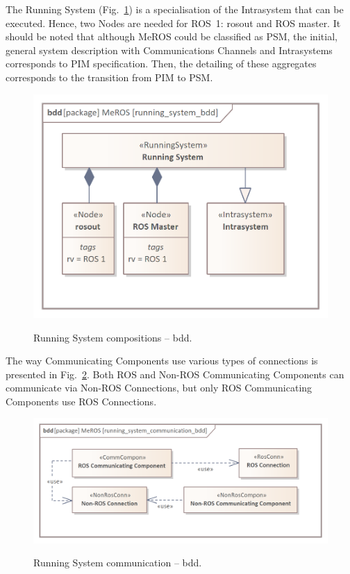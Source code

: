 The Running System (Fig.~\ref{fig:running_system_bdd}) is a specialisation of the Intrasystem that can be executed. Hence, two Nodes are needed for ROS~1: rosout and ROS master.
It should be noted that although MeROS could be classified as PSM, the initial, general system description with Communications Channels and Intrasystems corresponds to PIM specification. Then, the detailing of these aggregates corresponds to the transition from PIM to PSM.


\begin{figure}[H]
    \centering
    \begin{center}
    {\includegraphics[scale=1.1]{../imgs/meros_pkg/running_system_bdd.png}}
    \end{center}
    \caption{Running System compositions -- bdd.}
    \label{fig:running_system_bdd}
\end{figure}

The way Communicating Components use various types of connections is presented in Fig.~\ref{fig:running_system_communication_bdd}. Both ROS and Non-ROS Communicating Components can communicate via Non-ROS Connections, but only ROS Communicating Components use ROS Connections.


\begin{figure}[H]
    \centering
    \begin{center}
    {\includegraphics[scale=1.1]{../imgs/meros_pkg/running_system_communication_bdd.png}}
    \end{center}
    \caption{Running System communication -- bdd.}
    \label{fig:running_system_communication_bdd}
\end{figure}

